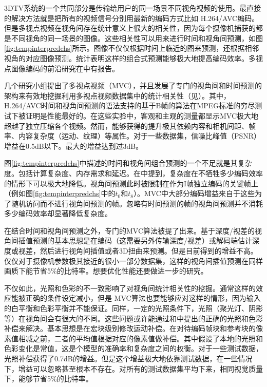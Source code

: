 3DTV系统的一个共同部分是传输给用户的同一场景不同视角视频的使用。最直接的解决方法就是把所有的视频信号分别用最新的编码方式比如 H.264/AVC编码。但是多视点视频在视角间存在统计意义上很大的相关性，因为每个摄像机捕获的都是不同视角的同一场景的图像。这些相关性可以用来进行时间和视角间预测，如图\ref{fig:tempinterpredchs}所示。图像不仅仅根据时间上临近的图来预测，还根据相邻视角的对应图像预测。统计表明这样的组合式预测能够极大地提高编码效率\cite{merkle2005statistical, kaup2006analysis}。多视点图像编码的前沿研究在中有报告。

几个研究小组提出了多视点视频（MVC），并且发展了专门的视角间和时间预测的架构来有效地挖掘利用多视点视频数据集中的统计相关性（见）。其中，H.264/AVC时间和视角间预测的语法支持的基于B帧的算法\cite{schwarz2006analysis}在MPEG标准的穷尽测试下被证明是性能最好的\cite{flierl2007motion, merkle2006efficient, mueller2006multi, merkle2007efficient}。在这些实验中，客观和主观的测量都显示MVC极大地超越了独立压缩各个视频。然而，能够获得的提升极其依赖内容和相机间距、帧率、内容复杂度（运动、纹理）等属性。对于一些数据集，信噪比峰值（PSNR）增益在0.5dB以下。最大的增益达到过3dB。

图\ref{fig:tempinterpredchs}中描述的时间和视角间组合预测的一个不足就是其复杂度。包括计算复杂度、内存需求和延迟。在中提到，复杂度在不牺牲多少编码效率的情形下可以极大地降低。视角间预测此时被限制在作为I帧独立编码的关键帧上（例如图\ref{fig:tempinterpredchs}中的$t_0$和$t_8$）。MVC中大部分编码增益来自于这些为了随机访问而不进行视角间预测的帧。忽略有时间预测的帧的视角间预测并不消耗多少编码效率却显著降低复杂度。

在结合时间和视角间预测之外，专门的MVC算法被提了出来。基于深度/视差的视角间插值预测\cite{martinian2006view, kitahara2006multi, martinian2006extensions}的基本思想是在编码（这需要另外传输深度/视差）或解码端估计深度或视差，然后进行视角间插值或者3D扭曲来预测。但是目前得到的增益不高。仅仅对于摄像机参数极其接近的很小一部分数据集，这样的视角间插值预测在同样画质下能节省5\%的比特率。想要优化性能还要做进一步的研究。

不仅如此，光照和色彩的不一致影响了对视角间统计相关性的挖掘。通常这样的效应能被正确的条件设定减小，但是 MVC算法也要能够应对这样的情形，因为输入的白平衡和色彩平衡并不能保证。同样，一定的光照条件下，光照（聚光灯、阴影等）在视角间会有很大的不同。这些问题或许能通过和中提出的正确的光照和色彩补偿来解决。基本思想是在宏块级别修改运动补偿。在对待编码帧块和参考块的像素值相减之前，二者的平均值根据对应的像素值做补偿。其中假设了本地的光照和色彩变化是常值，这是个模型的准确率和复杂度之间的权衡。对于一些测试数据，光照补偿获得了0.7dB的增益。但是这个增益极大地依靠测试数据，在一些情况下，增益可以忽略甚至根本不存在。对所有的测试数据集平均下来，相同视觉质量下，能够节省5\%的比特率。

